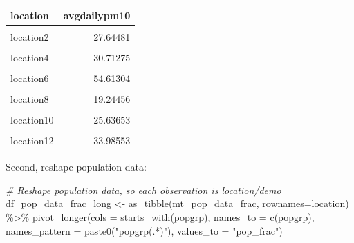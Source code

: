 \documentclass[
]{book}
\newenvironment{Shaded}{\begin{snugshade}}{\end{snugshade}}
\newcommand{\AttributeTok}[1]{\textcolor[rgb]{0.77,0.63,0.00}{#1}}
\newcommand{\CommentTok}[1]{\textcolor[rgb]{0.56,0.35,0.01}{\textit{#1}}}
\newcommand{\FunctionTok}[1]{\textcolor[rgb]{0.00,0.00,0.00}{#1}}
\newcommand{\NormalTok}[1]{#1}
\newcommand{\OtherTok}[1]{\textcolor[rgb]{0.56,0.35,0.01}{#1}}
\newcommand{\SpecialCharTok}[1]{\textcolor[rgb]{0.00,0.00,0.00}{#1}}
\newcommand{\StringTok}[1]{\textcolor[rgb]{0.31,0.60,0.02}{#1}}
\begin{document}
\begin{table}[!h]
\centering
\begin{tabular}{l|r}
\hline
location & avgdailypm10\\
\hline
\cellcolor{gray!6}{location1} & \cellcolor{gray!6}{24.62676}\\
\hline
location2 & 27.64481\\
\hline
\cellcolor{gray!6}{location3} & \cellcolor{gray!6}{51.70466}\\
\hline
location4 & 30.71275\\
\hline
\cellcolor{gray!6}{location5} & \cellcolor{gray!6}{31.35114}\\
\hline
location6 & 54.61304\\
\hline
\cellcolor{gray!6}{location7} & \cellcolor{gray!6}{35.20967}\\
\hline
location8 & 19.24456\\
\hline
\cellcolor{gray!6}{location9} & \cellcolor{gray!6}{23.56121}\\
\hline
location10 & 25.63653\\
\hline
\cellcolor{gray!6}{location11} & \cellcolor{gray!6}{45.99021}\\
\hline
location12 & 33.98553\\
\hline
\end{tabular}
\end{table}

Second, reshape population data:

\begin{Shaded}
\begin{Highlighting}[]
\CommentTok{\# Reshape population data, so each observation is location/demo}
\NormalTok{df\_pop\_data\_frac\_long }\OtherTok{\textless{}{-}} \FunctionTok{as\_tibble}\NormalTok{(mt\_pop\_data\_frac, }\AttributeTok{rownames=}\StringTok{\textquotesingle{}location\textquotesingle{}}\NormalTok{) }\SpecialCharTok{\%\textgreater{}\%}
  \FunctionTok{pivot\_longer}\NormalTok{(}\AttributeTok{cols =} \FunctionTok{starts\_with}\NormalTok{(}\StringTok{\textquotesingle{}popgrp\textquotesingle{}}\NormalTok{),}
               \AttributeTok{names\_to =} \FunctionTok{c}\NormalTok{(}\StringTok{\textquotesingle{}popgrp\textquotesingle{}}\NormalTok{),}
               \AttributeTok{names\_pattern =} \FunctionTok{paste0}\NormalTok{(}\StringTok{"popgrp(.*)"}\NormalTok{),}
               \AttributeTok{values\_to =} \StringTok{"pop\_frac"}\NormalTok{)}
\end{Highlighting}
\end{Shaded}
\end{document}
